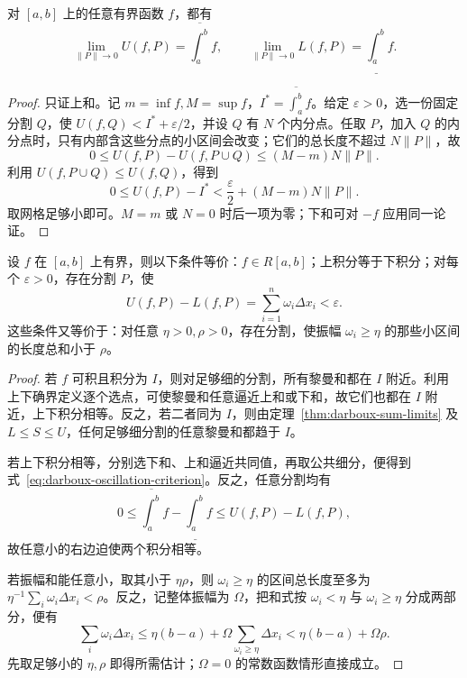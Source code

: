 \documentclass[UTF8,12pt,a4paper,fontset=fandol]{ctexbook}
\begin{document}
\begin{theorem}[达布定理]
\label{thm:darboux-sum-limits}
对 $[a,b]$ 上的任意有界函数 $f$，都有
\[
    \lim_{\|P\|\to0}U(f,P)=\overline{\int_a^b}f,\qquad
    \lim_{\|P\|\to0}L(f,P)=\underline{\int_a^b}f.
\]
\end{theorem}
\begin{proof}
只证上和。记 $m=\inf f,M=\sup f$，$I^*=\overline{\int_a^b}f$。给定 $\varepsilon>0$，选一份固定分割 $Q$，使 $U(f,Q)<I^*+\varepsilon/2$，并设 $Q$ 有 $N$ 个内分点。任取 $P$，加入 $Q$ 的内分点时，只有内部含这些分点的小区间会改变；它们的总长度不超过 $N\|P\|$，故
\[
    0\leq U(f,P)-U(f,P\cup Q)\leq(M-m)N\|P\|.
\]
利用 $U(f,P\cup Q)\leq U(f,Q)$，得到
\[
    0\leq U(f,P)-I^*
    <\frac{\varepsilon}{2}+(M-m)N\|P\|.
\]
取网格足够小即可。$M=m$ 或 $N=0$ 时后一项为零；下和可对 $-f$ 应用同一论证。
\end{proof}

\begin{theorem}[黎曼可积判据]
\label{thm:darboux-integrability-criteria}
设 $f$ 在 $[a,b]$ 上有界，则以下条件等价：$f\in R[a,b]$；上积分等于下积分；对每个 $\varepsilon>0$，存在分割 $P$，使
\begin{equation}
    U(f,P)-L(f,P)=\sum_{i=1}^n\omega_i\Delta x_i<\varepsilon.
    \label{eq:darboux-oscillation-criterion}
\end{equation}
这些条件又等价于：对任意 $\eta>0,\rho>0$，存在分割，使振幅 $\omega_i\geq\eta$ 的那些小区间的长度总和小于 $\rho$。
\end{theorem}
\begin{proof}
若 $f$ 可积且积分为 $I$，则对足够细的分割，所有黎曼和都在 $I$ 附近。利用上下确界定义逐个选点，可使黎曼和任意逼近上和或下和，故它们也都在 $I$ 附近，上下积分相等。反之，若二者同为 $I$，则由定理~\ref{thm:darboux-sum-limits} 及 $L\leq S\leq U$，任何足够细分割的任意黎曼和都趋于 $I$。

若上下积分相等，分别选下和、上和逼近共同值，再取公共细分，便得到式~\eqref{eq:darboux-oscillation-criterion}。反之，任意分割均有
\[
    0\leq\overline{\int_a^b}f-\underline{\int_a^b}f
    \leq U(f,P)-L(f,P),
\]
故任意小的右边迫使两个积分相等。

若振幅和能任意小，取其小于 $\eta\rho$，则 $\omega_i\geq\eta$ 的区间总长度至多为 $\eta^{-1}\sum_i\omega_i\Delta x_i<\rho$。反之，记整体振幅为 $\Omega$，把和式按 $\omega_i<\eta$ 与 $\omega_i\geq\eta$ 分成两部分，便有
\[
    \sum_i\omega_i\Delta x_i
    \leq\eta(b-a)+\Omega\sum_{\omega_i\geq\eta}\Delta x_i
    <\eta(b-a)+\Omega\rho.
\]
先取足够小的 $\eta,\rho$ 即得所需估计；$\Omega=0$ 的常数函数情形直接成立。
\end{proof}
\end{document}
